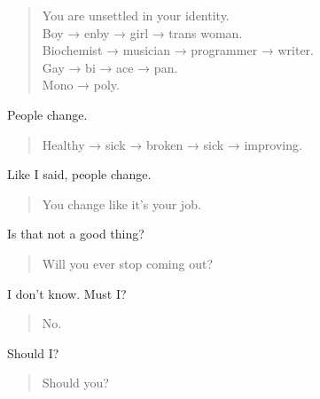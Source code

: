 \begin{quote}
You are unsettled in your identity.\\
Boy → enby → girl → trans woman.\\
Biochemist → musician → programmer → writer.\\
Gay → bi → ace → pan.\\
Mono → poly.
\end{quote}

People change.

\begin{quote}
Healthy → sick → broken → sick → improving.
\end{quote}

Like I said, people change.

\begin{quote}
You change like it's your job.
\end{quote}

Is that not a good thing?

\begin{quote}
Will you ever stop coming out?
\end{quote}

I don't know. Must I?

\begin{quote}
No.
\end{quote}

Should I?

\begin{quote}
Should you?
\end{quote}
